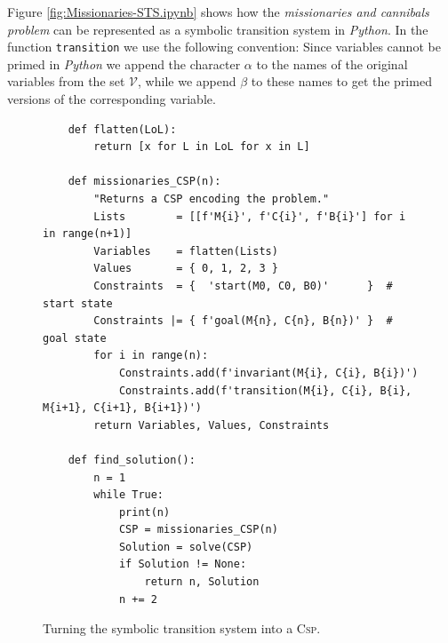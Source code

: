Figure \ref{fig:Missionaries-STS.ipynb} shows how the \emph{missionaries and cannibals problem} can be
represented as a symbolic transition system in \textsl{Python}.  In the function \texttt{transition} 
we use the following convention: Since variables cannot be primed in
\textsl{Python} we append the character $\alpha$ to the names of the original
variables from the set $\mathcal{V}$, while we append $\beta$ to these names to get the primed versions of the
corresponding variable.


\begin{figure}[!ht]
\centering
\begin{verbatim}
    def flatten(LoL):
        return [x for L in LoL for x in L]
                    
    def missionaries_CSP(n):
        "Returns a CSP encoding the problem."
        Lists        = [[f'M{i}', f'C{i}', f'B{i}'] for i in range(n+1)]
        Variables    = flatten(Lists)
        Values       = { 0, 1, 2, 3 }
        Constraints  = {  'start(M0, C0, B0)'      }  # start state
        Constraints |= { f'goal(M{n}, C{n}, B{n})' }  # goal state
        for i in range(n):
            Constraints.add(f'invariant(M{i}, C{i}, B{i})')
            Constraints.add(f'transition(M{i}, C{i}, B{i}, M{i+1}, C{i+1}, B{i+1})')
        return Variables, Values, Constraints
        
    def find_solution():
        n = 1
        while True:
            print(n)
            CSP = missionaries_CSP(n)
            Solution = solve(CSP)
            if Solution != None:
                return n, Solution
            n += 2
\end{verbatim}
\vspace*{-0.3cm}
\caption{Turning the symbolic transition system into a \textsc{Csp}.}
\label{fig:Missionaries-STS.ipynb-2}
\end{figure}

